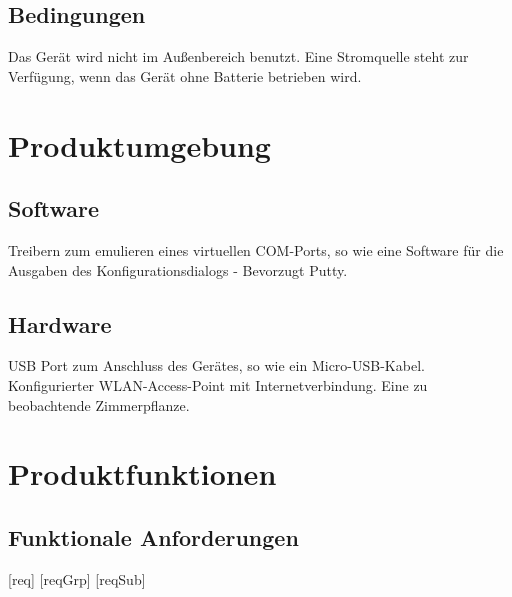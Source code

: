 \documentclass[pointlessnumbers]{scrartcl}
\begin{document}
\subsection{Bedingungen}
    Das Gerät wird nicht im Außenbereich benutzt. Eine Stromquelle steht zur Verfügung, wenn das Gerät ohne Batterie betrieben wird.
\section{Produktumgebung}
\subsection{Software}
    Treibern zum emulieren eines virtuellen COM-Ports, so wie eine Software für die Ausgaben des Konfigurationsdialogs - Bevorzugt Putty.
\subsection{Hardware}
    USB Port zum Anschluss des Gerätes, so wie ein Micro-USB-Kabel. Konfigurierter WLAN-Access-Point mit Internetverbindung. Eine zu beobachtende Zimmerpflanze.



\newpage
\section{Produktfunktionen}

\subsection{Funktionale Anforderungen}

\newcommand{\BreiteErsterTab}{3cm}
\newcommand{\BreiteZweiterTab}{10cm}






[req] 
[reqGrp] 
[reqSub] 

\renewcommand\thereq{/F\arabic{req}000/} 
\renewcommand\thereqGrp{/F\arabic{req}\arabic{reqGrp}00/} 
\renewcommand\thereqSub{/F\arabic{req}\arabic{reqGrp}\arabic{reqSub}0/} 
\renewcommand\thereqProc{/F\arabic{req}\arabic{reqGrp}\arabic{reqSub}\arabic{reqProc}/} 
\end{document}

